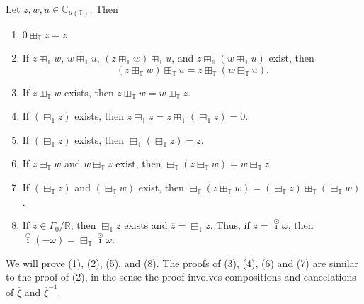 \documentclass[reqno]{amsart}
\begin{document}
\begin{proposition}
\label{prop:boxPlusList}
Let $z,w,u \in \mathbb{C}_{\mu(\mathbb{T})}$. Then
\begin{enumerate}
 \item $0 \boxplus_{\mathbb{T}} z = z$
 \item If $z \boxplus_{\mathbb{T}} w$, $w \boxplus_{\mathbb{T}} u$, $(z \boxplus_{\mathbb{T}} w) \boxplus_{\mathbb{T}} u$, and $z \boxplus_{\mathbb{T}} (w \boxplus_{\mathbb{T}} u)$ exist, then $$(z \boxplus_{\mathbb{T}} w) \boxplus_{\mathbb{T}} u = z \boxplus_{\mathbb{T}} (w \boxplus_{\mathbb{T}} u).$$
 \item If $z \boxplus_{\mathbb{T}} w$ exists, then $z \boxplus_{\mathbb{T}} w = w \boxplus_{\mathbb{T}} z$.
 \item If $(\boxminus_{\mathbb{T}} z)$ exists, then $z \boxminus_{\mathbb{T}} z = z \boxplus_{\mathbb{T}} (\boxminus_{\mathbb{T}} z) = 0$.
 \item If $(\boxminus_{\mathbb{T}} z)$ exists, then $\boxminus_{\mathbb{T}}(\boxminus_{\mathbb{T}} z) = z$.
 \item If $z \boxminus_{\mathbb{T}} w$ and $w \boxminus_{\mathbb{T}} z$ exist, then $\boxminus_{\mathbb{T}}(z \boxminus_{\mathbb{T}} w) = w \boxminus_{\mathbb{T}} z$.
 \item If $(\boxminus_{\mathbb{T}} z)$ and $(\boxminus_{\mathbb{T}} w)$ exist, then $\boxminus_{\mathbb{T}}(z \boxplus_{\mathbb{T}} w) = (\boxminus_{\mathbb{T}} z) \boxplus_{\mathbb{T}} (\boxminus_{\mathbb{T}} w)$.
 \item If $z \in \Gamma_0 / \mathbb{R}$, then $\boxminus_{\mathbb{T}} z$ exists and
 $\overline{z} = \boxminus_{\mathbb{T}} z$. Thus, if $z = \overset{\odot}{\imath} \omega$, then $\overset{\odot}{\imath}(-\omega) = \boxminus_{\mathbb{T}} \overset{\odot}{\imath} \omega$.
 \end{enumerate}
 \end{proposition}

We will prove (1), (2), (5), and (8). The proofs of (3), (4), (6) and (7) are
similar to the proof of (2), in the sense the proof involves compositions and
cancelations of $\overline{\xi}$ and $\overline{\xi}^{-1}$.
\end{document}
